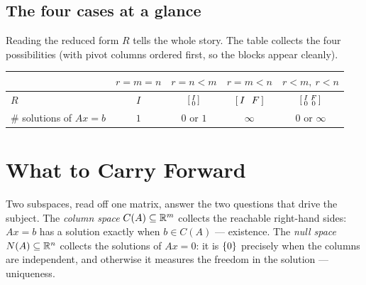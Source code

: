 \subsection{The four cases at a glance}

Reading the reduced form $R$ tells the whole story. The table collects the four possibilities (with pivot columns ordered first, so the blocks appear cleanly).

\begin{center}
\begin{tabular}{lcccc}
\toprule
 & $r=m=n$ & $r=n<m$ & $r=m<n$ & $r<m,\ r<n$ \\
\midrule
$R$ &
$I$ &
$\left[\begin{smallmatrix} I \\ 0 \end{smallmatrix}\right]$ &
$\br{\,I\ \ F\,}$ &
$\left[\begin{smallmatrix} I & F \\ 0 & 0 \end{smallmatrix}\right]$ \\[4pt]
\# solutions of $Ax=b$ &
$1$ & $0$ or $1$ & $\infty$ & $0$ or $\infty$ \\
\bottomrule
\end{tabular}
\end{center}


\section{What to Carry Forward}

Two subspaces, read off one matrix, answer the two questions that drive the subject. The \emph{column space} $C(A)\subseteq\mathbb{R}^m$ collects the reachable right-hand sides: $Ax=b$ has a solution exactly when $b\in C(A)$ --- existence. The \emph{null space} $N(A)\subseteq\mathbb{R}^n$ collects the solutions of $Ax=0$: it is $\left\{0\right\}$ precisely when the columns are independent, and otherwise it measures the freedom in the solution --- uniqueness.

